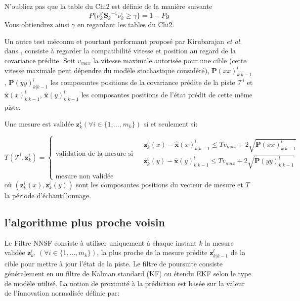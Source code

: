 \documentclass[10pt,french,a4paper]{report}
\begin{document}
	 	N'oubliez pas que la table du Chi2 est définie de la manière suivante
	 		\begin{equation} 
	  P\{ \nu_k^{i'}{\mathbf{S}_k}^{-1}\nu_k^i \geq \gamma \} = 1 - Pg
	 	\end{equation}
	 	Vous obtiendrez ainsi $\gamma$ en regardant les tables du Chi2.
	 	
	 	Un autre test méconnu et pourtant performant proposé par Kirubarajan \textit{et al.} dans \cite{Kirubarajan00}, consiste à regarder la compatibilité vitesse et position au regard de la covariance prédite. Soit $v_{max}$ la vitesse maximale autorisée pour une cible (cette vitesse maximale peut dépendre du modèle stochastique considéré), $\mathbf{P}(xx)_{k|k-1}^l$, $\mathbf{P}(yy)_{k|k-1}^l$ les composantes positions de la covariance prédite de la piste $\mathcal{T}^l$ et $\hat{\mathbf{x}}(x)_{k|k-1}^l$, $\hat{\mathbf{x}}(y)_{k|k-1}^l$ les composantes positions de l'état prédit de cette même piste. 
	 	
	 	Une mesure est validée  $\mathbf{z}^i_k (\forall i \in \{1,\ldots,m_k\})$ si et seulement si:
	 	
		\begin{equation} 
	   T(\mathcal{T}^l,\mathbf{z}_k^i) =  \left\{  
	   \begin{aligned} \text{validation de la mesure si } & \begin{aligned} \mathbf{z}^i_k(x) - \hat{\mathbf{x}}(x)_{k|k-1}^l   \leq \textit{T}v_{max} +  2  \sqrt{\mathbf{P}(xx)_{k|k-1}^l}& \\ \mathbf{z}^i_k(y) -\hat{\mathbf{x}}(y)_{k|k-1}^l  \leq \textit{T}v_{max} + 2  \sqrt{\mathbf{P}(yy)_{k|k-1}^l} &  \end{aligned}   \\
	   \text{mesure non validée } &
	    \end{aligned} \right.
	 	\end{equation} 	
où $(\mathbf{z}^i_k(x),\mathbf{z}^i_k(y))$ sont les composantes positions du vecteur de mesure et $T$ la période d'échantillonnage.
	 	
									\subsection{l'algorithme plus proche voisin}
									
									Le Filtre \acf{NNSF} consiste à utiliser uniquement à chaque instant
	$k$ la mesure validée $\mathbf{z}_k^i$, $(\forall i \in \{1,\ldots,m_k\})$, la plus proche de la mesure prédite $ \mathbf{z}^l_{k|k-1}$ de la cible  pour mettre à jour l'état de la piste. Le filtre de poursuite consiste généralement en un filtre de Kalman standard (KF)
	ou étendu \acf{EKF} selon le type de modèle utilisé.
	La notion de proximité à la prédiction est basée sur la valeur de l'innovation normalisée définie par:
	
\end{document}

